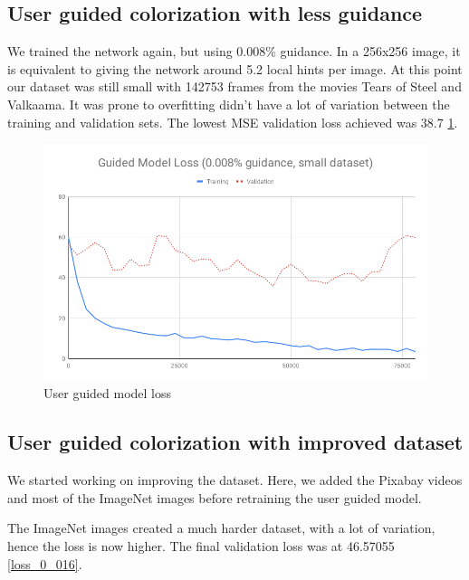 \documentclass[12pt,openright,oneside,a4paper,english]{abntex2}
\begin{document}
\begin{otherlanguage}{english}
\subsection{User guided colorization with less guidance}

We trained the network again, but using 0.008\% guidance. In a 256x256 image, it is equivalent to giving the network around 5.2 local hints per image. At this point our dataset was still small with 142753 frames from the movies Tears of Steel and Valkaama. It was prone to overfitting didn't have a lot of variation between the training and validation sets. The lowest MSE validation loss achieved  was 38.7 \ref{loss_0_008}.

\begin{figure}[!htb]
\centering
\includegraphics[width=\textwidth]{loss/Guided_0_008}
\caption{User guided model loss}
\label{loss_0_008}
\end{figure}

\subsection{User guided colorization with improved dataset}

We started working on improving the dataset. Here, we added the Pixabay videos and most of the ImageNet images before retraining the user guided model.

The ImageNet images created a much harder dataset, with a lot of variation, hence the loss is now higher. The final validation loss was at 46.57055 \ref{loss_0_016}.


\end{otherlanguage}
\end{document}
